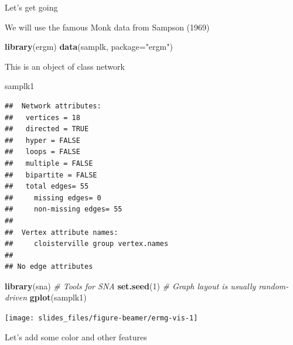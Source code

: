 \documentclass[10pt,ignorenonframetext,aspectratio=169,]{beamer}
\newenvironment{Shaded}{\begin{snugshade}}{\end{snugshade}}
\newcommand{\CommentTok}[1]{\textcolor[rgb]{0.56,0.35,0.01}{\textit{#1}}}
\newcommand{\DataTypeTok}[1]{\textcolor[rgb]{0.13,0.29,0.53}{#1}}
\newcommand{\DecValTok}[1]{\textcolor[rgb]{0.00,0.00,0.81}{#1}}
\newcommand{\KeywordTok}[1]{\textcolor[rgb]{0.13,0.29,0.53}{\textbf{#1}}}
\newcommand{\NormalTok}[1]{#1}
\newcommand{\StringTok}[1]{\textcolor[rgb]{0.31,0.60,0.02}{#1}}
\begin{document}
\begin{frame}[fragile]{Let's get going}
\protect\hypertarget{lets-get-going}{}

We will use the famous Monk data from Sampson (1969) \pause

\footnotesize

\begin{Shaded}
\begin{Highlighting}[]
\KeywordTok{library}\NormalTok{(ergm)}
\KeywordTok{data}\NormalTok{(samplk, }\DataTypeTok{package=}\StringTok{"ergm"}\NormalTok{)}
\end{Highlighting}
\end{Shaded}

\normalsize
\pause

This is an object of class network

\footnotesize

\begin{Shaded}
\begin{Highlighting}[]
\NormalTok{samplk1}
\end{Highlighting}
\end{Shaded}

\begin{verbatim}
##  Network attributes:
##   vertices = 18 
##   directed = TRUE 
##   hyper = FALSE 
##   loops = FALSE 
##   multiple = FALSE 
##   bipartite = FALSE 
##   total edges= 55 
##     missing edges= 0 
##     non-missing edges= 55 
## 
##  Vertex attribute names: 
##     cloisterville group vertex.names 
## 
## No edge attributes
\end{verbatim}

\normalsize

\end{frame}

\begin{frame}[fragile]

\footnotesize

\begin{Shaded}
\begin{Highlighting}[]
\KeywordTok{library}\NormalTok{(sna) }\CommentTok{# Tools for SNA}
\KeywordTok{set.seed}\NormalTok{(}\DecValTok{1}\NormalTok{)  }\CommentTok{# Graph layout is usually random-driven}
\KeywordTok{gplot}\NormalTok{(samplk1)}
\end{Highlighting}
\end{Shaded}

\begin{center}\texttt{[image: slides\_files/figure-beamer/ermg-vis-1]} \end{center}

\normalsize

\pause Let's add some color and other features

\end{frame}
\end{document}
